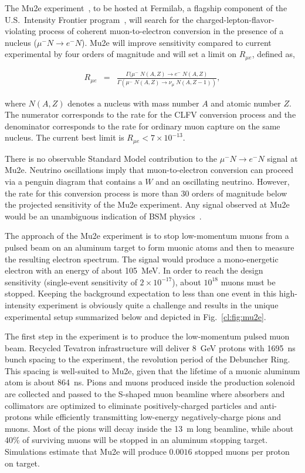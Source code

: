 

\label{cl:sec:mu2e}

The Mu2e experiment~\cite{Abrams:2012er}, to be hosted at Fermilab, a flagship component
of the U.S.\ Intensity Frontier program~\cite{IF_review}, will
search for the charged-lepton-flavor-violating process of coherent
muon-to-electron conversion in the presence of a nucleus ($\mu^-N
\rightarrow e^-N$).  Mu2e will improve sensitivity
compared to current experimental by four orders of
magnitude and will set a limit on $R_{\mu e}$, defined
as,

%
\begin{eqnarray}
  R_{\mu e} &=& \frac
  {\Gamma(\mu^{-}\;  N(A,Z) \to e^{-}\; N(A,Z)}  {\Gamma(\mu^{-}\; N(A,Z)\to \nu_{\mu}\; N(A,Z-1))},\end{eqnarray}
%

where $N(A,Z)$ denotes a nucleus with mass number $A$ and atomic
number $Z$.  The numerator corresponds to the rate for the CLFV
conversion process and the denominator corresponds to the rate for
ordinary muon capture on the same nucleus.  The current best limit is
$R_{\mu{}e}<7\times10^{-13}$\cite{Bertl:2006up}.

There is no observable Standard Model contribution to the $\mu^-N
\rightarrow e^-N$ signal at Mu2e.  Neutrino oscillations imply that
muon-to-electron conversion can proceed via a penguin diagram that
contains a $W$ and an oscillating neutrino. However, the rate for this
conversion process is more than 30 orders of magnitude below the
projected sensitivity of the Mu2e experiment.  Any signal observed at
Mu2e would be an unambiguous indication of BSM
physics~\cite{Marciano:2008zz,deGouvea:2013zba}.

The approach of the Mu2e experiment is to stop low-momentum muons from
a pulsed beam on an aluminum target to form muonic atoms and then to
measure the resulting electron spectrum.  The signal would produce a
mono-energetic electron with an energy of about 105~MeV.  In order to
reach the design sensitivity (single-event sensitivity of $2\times
10^{-17}$), about $10^{18}$ muons must be stopped.  Keeping the
background expectation to less than one event in this high-intensity
experiment is obviously quite a challenge and results in the unique
experimental setup summarized below and depicted in
Fig.~\ref{cl:fig:mu2e}.

The first step in the experiment is to produce the low-momentum pulsed
muon beam.  Recycled Tevatron infrastructure will deliver 8~GeV
protons with 1695~ns bunch spacing to the experiment, the
revolution period of the Debuncher Ring. This spacing is well-suited to Mu2e, given that the lifetime of a muonic aluminum atom is about
864~ns.  Pions and muons produced inside the production solenoid are
collected and passed to the S-shaped muon beamline where absorbers and
collimators are optimized to eliminate positively-charged particles
and anti-protons while efficiently transmitting low-energy
negatively-charge pions and muons.  Most of the pions will decay
inside the 13~m long beamline, while about 40\% of surviving muons
will be stopped in an aluminum stopping target.  Simulations estimate
that Mu2e will produce $0.0016$ stopped muons per proton on target.



